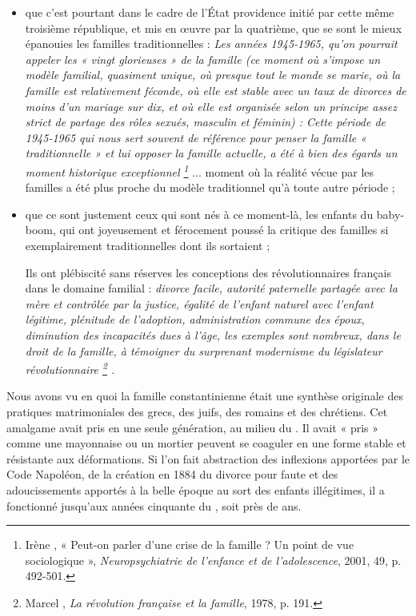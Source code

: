 \begin{itemize}
\item que c'est pourtant dans le cadre de l'État providence initié par cette même troisième république, et mis en œuvre par la quatrième, que se sont le mieux épanouies les familles traditionnelles : {\emph{Les années 1945-1965, qu'on pourrait appeler les « vingt glorieuses » de la famille (ce moment où s'impose un modèle familial, quasiment unique, où presque tout le monde se marie, où la famille est relativement féconde, où elle est stable avec un taux de divorces de moins d'un mariage sur dix, et où elle est organisée selon un principe assez strict de partage des rôles sexués, masculin et féminin) : Cette période de 1945-1965 qui nous sert souvent de référence pour penser la famille « traditionnelle » et lui opposer la famille actuelle, a été à bien des égards un moment historique exceptionnel%
\footnote{Irène , « Peut-on parler d'une crise de la famille ? Un point de vue sociologique », \emph{Neuropsychiatrie de l'enfance et de l'adolescence}, 2001, 49, p. 492-501.}%
}} ... moment où la réalité vécue par les familles a été plus proche du modèle traditionnel qu'à toute autre période ;

\item que ce sont justement ceux qui sont nés à ce moment-là, les enfants du baby-boom, qui ont joyeusement et férocement poussé la critique des familles si exemplairement traditionnelles dont ils sortaient ;
 
 Ils ont plébiscité sans réserves les conceptions des révolutionnaires français dans le domaine familial : {\emph{divorce facile, autorité paternelle partagée avec la mère et contrôlée par la justice, égalité de l'enfant naturel avec l'enfant légitime, plénitude de l'adoption, administration commune des époux, diminution des incapacités dues à l'âge, les exemples sont nombreux, dans le droit de la famille, à témoigner du surprenant modernisme du législateur révolutionnaire%
\footnote{Marcel , \emph{La révolution française et la famille}, 1978, p. 191.}%
.}}
\end{itemize}
 
 
 Nous avons vu en quoi la famille constantinienne était une synthèse originale des pratiques matrimoniales des grecs, des juifs, des romains et des chrétiens. Cet amalgame avait pris en une seule génération, au milieu du . Il avait « pris » comme une mayonnaise ou un mortier peuvent se coaguler en une forme stable et résistante aux déformations.  Si l'on fait abstraction des inflexions apportées par le Code Napoléon, de la création en 1884 du divorce pour faute et des adoucissements apportés à la belle époque au sort des enfants illégitimes, il a fonctionné jusqu'aux années cinquante du , soit près de  ans. 
 
